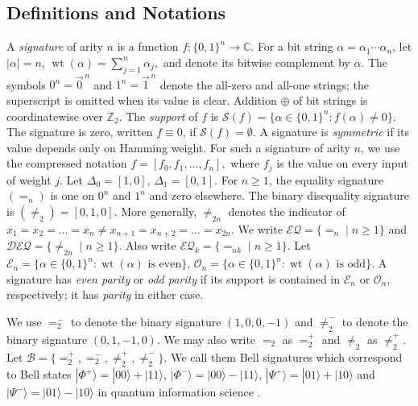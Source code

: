 
\subsection{Definitions and Notations}



A \emph{signature} of arity $n$ is a function
$f:\{0,1\}^n\to\mathbb C$. 
For a bit string $\alpha=\alpha_1\cdots\alpha_n$, let $|\alpha|=n$,
\(
\operatorname{wt}(\alpha)=\sum_{j=1}^n\alpha_j,
\)
and denote its bitwise complement by $\overline{\alpha}$.  
The symbols
$0^n=\vec 0^{\,n}$ and $1^n=\vec 1^{\,n}$ denote the all-zero and all-one
strings; the superscript is omitted when its value is clear.  Addition
$\oplus$ of bit strings is coordinatewise over $\mathbb Z_2$.
The \emph{support} of $f$ is
\(
\mathscr S(f)=\{\alpha\in\{0,1\}^n:f(\alpha)\ne0\}.
\)
The signature is zero, written $f\equiv0$, if $\mathscr S(f)=\emptyset$.
A signature is \emph{symmetric} if its value depends only on Hamming weight.
For such a signature of arity $n$, we use the compressed notation
\(
f=[f_0,f_1,\ldots,f_n],
\)
where $f_j$ is the value on every input of weight $j$. 
Let
\(
\Delta_0=[1,0], \,\Delta_1=[0,1].
\)
For $n\ge1$, the equality signature $(=_n)$ is one on $0^n$ and $1^n$ and
zero elsewhere.  The binary disequality signature is
$(\neq_2)=[0,1,0]$. 
More generally, $\neq_{2n}$ denotes the indicator of
\(
x_1= x_2=\ldots= x_n\neq
x_{n+1}=x_{n+2}=\ldots= x_{2n}.
\)
We
write $\mathcal{EQ}=\{=_n\mid n\ge1\}$ and
$\mathcal{DEQ}=\{\neq_{2n}\mid n\ge1\}$.
Also write $\mathcal{EQ}_k=\{=_{nk}\mid n\ge1\}$.
Let
\(
\mathscr E_n=\{\alpha\in\{0,1\}^n:\operatorname{wt}(\alpha)
\text{ is even}\},\,
\mathscr O_n=\{\alpha\in\{0,1\}^n:\operatorname{wt}(\alpha)
\text{ is odd}\}.
\)
A signature has \emph{even parity} or \emph{odd parity} if its support is
contained in $\mathscr E_n$ or $\mathscr O_n$, respectively; it has
\emph{parity} in either case.

We use $=_2^-$ to denote the binary signature $(1, 0, 0, -1)$ and $\neq_2^-$ to denote the binary signature $(0, 1, -1, 0)$.
We may also write $=_2$ as $=_2^+$ and $\neq_2$ as $\neq_2^+$. 
Let $\mathcal{B}=\{=^+_2, =_2^-, \neq_2^+, \neq_2^-\}$.
We call them Bell signatures which correspond to Bell states $|\Phi^+\rangle=|00\rangle+|11\rangle$, $|\Phi^-\rangle=|00\rangle-|11\rangle$, 
$|\Psi^+\rangle=|01\rangle+|10\rangle$ and 
$|\Psi^-\rangle=|01\rangle-|10\rangle$ in quantum information science \cite{bell1964einstein}.


